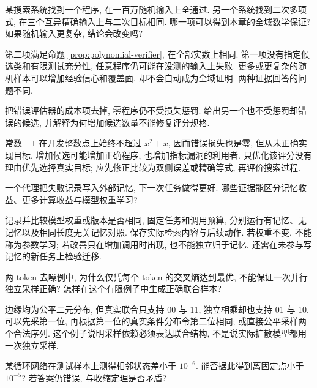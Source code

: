 
\begin{exercise}
某搜索系统找到一个程序, 在一百万随机输入上全通过. 另一个系统找到二次多项式, 在三个互异精确输入上与二次目标相同. 哪一项可以得到本章的全域数学保证? 如果随机输入更复杂, 结论会改变吗?
\end{exercise}
\begin{solution}
第二项满足命题 \ref{prop:polynomial-verifier}, 在全部实数上相同. 第一项没有指定候选类和有限测试充分性, 任意程序仍可能在没测的输入上失败. 更多或更复杂的随机样本可以增加经验信心和覆盖面, 却不会自动成为全域证明. 两种证据回答的问题不同.
\end{solution}
\begin{exercise}
把错误评估器的成本项去掉, 零程序仍不受损失惩罚. 给出另一个也不受惩罚却错误的候选, 并解释为何增加候选数量不能修复评分规格.
\end{exercise}
\begin{solution}
常数 $-1$ 在开发整数点上始终不超过 $x^2+x$, 因而错误损失也是零, 但从未正确实现目标. 增加候选可能增加正确程序, 也增加指标漏洞的利用者. 只优化该评分没有理由优先选择真实目标; 应先修正比较为双侧误差或精确等式, 再评价搜索过程.
\end{solution}
\begin{exercise}
一个代理把失败记录写入外部记忆, 下一次任务做得更好. 哪些证据能区分记忆收益、更多计算收益与模型权重学习?
\end{exercise}
\begin{solution}
记录并比较模型权重或版本是否相同, 固定任务和调用预算, 分别运行有记忆、无记忆以及相同长度无关记忆对照. 保存实际检索内容与后续动作. 若权重不变, 不能称为参数学习; 若改善只在增加调用时出现, 也不能独立归于记忆. 还需在未参与写记忆的新任务上检验迁移.
\end{solution}
\begin{exercise}
两 token 去噪例中, 为什么仅凭每个 token 的交叉熵达到最优, 不能保证一次并行独立采样正确? 怎样在这个有限例子中生成正确联合样本?
\end{exercise}
\begin{solution}
边缘均为公平二元分布, 但真实联合只支持 00 与 11, 独立相乘却也支持 01 与 10. 可以先采第一位, 再根据第一位的真实条件分布令第二位相同; 或直接公平采样两个合法序列. 这个例子说明采样依赖必须表达联合结构, 不是说实际扩散模型都用一次独立采样.
\end{solution}
\begin{exercise}
某循环网络在测试样本上测得相邻状态差小于 $10^{-6}$. 能否据此得到离固定点小于 $10^{-5}$? 若答案仍错误, 与收缩定理是否矛盾?
\end{exercise}
